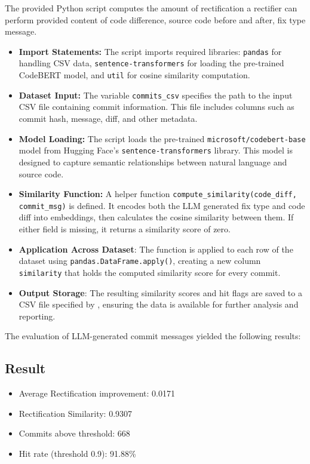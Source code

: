 \documentclass[12pt,a4paper]{article}
\begin{document}
The provided Python script computes the amount of rectification a rectifier can perform provided content of code difference, source code before and after, fix type message.

\begin{itemize}
    \item \textbf{Import Statements:} The script imports required libraries: \texttt{pandas} for handling CSV data, \texttt{sentence-transformers} for loading the pre-trained CodeBERT model, and \texttt{util} for cosine similarity computation.
    \item \textbf{Dataset Input:} The variable \texttt{commits\_csv} specifies the path to the input CSV file containing commit information. This file includes columns such as commit hash, message, diff, and other metadata.
    \item \textbf{Model Loading:} The script loads the pre-trained \texttt{microsoft/codebert-base} model from Hugging Face’s \texttt{sentence-transformers} library. This model is designed to capture semantic relationships between natural language and source code.
    \item \textbf{Similarity Function:} A helper function \texttt{compute\_similarity(code\_diff, commit\_msg)} is defined. It encodes both the LLM generated fix type and code diff into embeddings, then calculates the cosine similarity between them. If either field is missing, it returns a similarity score of zero.
    \item \textbf{Application Across Dataset}: The function is applied to each row of the dataset using \texttt{pandas.DataFrame.apply()}, creating a new column \texttt{similarity} that holds the computed similarity score for every commit.
    \item \textbf{Output Storage}: The resulting similarity scores and hit flags are saved to a CSV file specified by \texttt{}, ensuring the data is available for further analysis and reporting.
\end{itemize}

The evaluation of LLM-generated commit messages yielded the following results:

\subsection*{Result}
\begin{itemize}
    \item Average Rectification improvement: 0.0171
    \item Rectification Similarity: 0.9307
    \item Commits above threshold: 668
    \item Hit rate (threshold 0.9): 91.88\%
\end{itemize}
\end{document}
